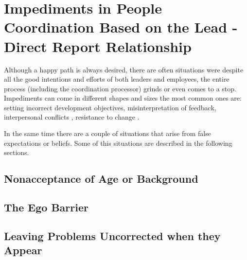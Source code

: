 \chapter{Impediments in People Coordination Based on the Lead - Direct Report Relationship}
\label{chapter:impediments}

Although a happy path is always desired, there are often situations were despite all the good intentions and efforts of both leaders and employees, the entire process (including the coordination processor) grinds or even comes to a stop. Impediments can come in different shapes and sizes the most common ones are: setting incorrect development objectives, misinterpretation of feedback, interpersonal conflicts \cite{abur-pm}, resistance to change \cite{abur-tl}. 

In the same time there are a couple of situations that arise from false expectations or beliefs. Some of this situations are described in the following sections.

\section{Nonacceptance of Age or Background}
\label{sec:unnaceptance}

\section{The Ego Barrier}
\label{sec:ego}

\section{Leaving Problems Uncorrected when they Appear}
\label{sec:uncorrected}
